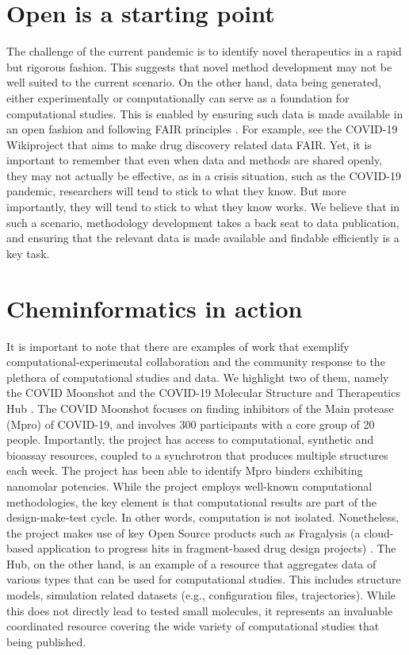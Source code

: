 \documentclass{bmcart}
\begin{document}
\section*{Open is a starting point}

The challenge of the current pandemic is to identify novel
therapeutics in a rapid but rigorous fashion. This suggests that novel
method development may not be well suited to the current scenario. On
the other hand, data being generated, either experimentally or
computationally can serve as a foundation for computational
studies. This is enabled by ensuring such data is made available in an
open fashion and following FAIR principles \cite{fair-1, fair-2}. For
example, see the COVID-19 Wikiproject \cite{wikidata} that aims to
make drug discovery related data FAIR. Yet, it is important to
remember that even when data and methods are shared openly, they may
not actually be effective, as in a crisis situation, such as the
COVID-19 pandemic, researchers will tend to stick to what they know.
But more importantly, they will tend to stick to what they know
works. We believe that in such a scenario, methodology development
takes a back seat to data publication, and ensuring that the relevant
data is made available and findable efficiently is a key task.

\section*{Cheminformatics in action}
\label{sec:chem-acti}

It is important to note that there are examples of work that exemplify
computational-experimental collaboration and the community response to
the plethora of computational studies and data. We highlight two of
them, namely the COVID Moonshot \cite{moonshot} and the COVID-19
Molecular Structure and Therapeutics Hub \cite{molssi}. The COVID
Moonshot focuses on finding inhibitors of the Main protease (Mpro) of
COVID-19, and involves 300 participants with a core group of 20
people. Importantly, the project has access to computational,
synthetic and bioassay resources, coupled to a synchrotron that
produces multiple structures each week. The project has been able to
identify Mpro binders exhibiting nanomolar potencies. While the
project employs well-known computational methodologies, the key
element is that computational results are part of the design-make-test
cycle. In other words, computation is not isolated. Nonetheless, the
project makes use of key Open Source products such as Fragalysis (a
cloud-based application to progress hits in fragment-based drug design
projects) \cite{fragalysis}. The Hub, on the other hand, is an example
of a resource that aggregates data of various types that can be used
for computational studies. This includes structure models, simulation
related datasets (e.g., configuration files, trajectories). While this
does not directly lead to tested small molecules, it represents an
invaluable coordinated resource covering the wide variety of
computational studies that being published.
\end{document}
